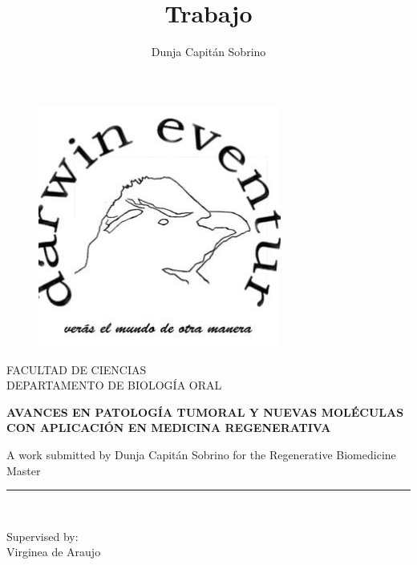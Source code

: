 \documentclass[a4paper,openright,12pt]{report}
\author{Dunja Capitán Sobrino}
\title{Trabajo}
\begin{document}
\begin{titlepage}

\begin{center}
\vspace*{-1in}
\begin{figure}[htb]
\begin{center}
\includegraphics[width=8cm]{./figuras/logo.jpg}
\end{center}
\end{figure}

FACULTAD DE CIENCIAS\\
\vspace*{0.15in}
DEPARTAMENTO DE BIOLOGÍA ORAL \\
\vspace*{0.6in}
\begin{large}
\textbf{AVANCES EN PATOLOGÍA TUMORAL Y NUEVAS
MOLÉCULAS CON APLICACIÓN EN MEDICINA REGENERATIVA} \\
\end{large}
\vspace*{0.2in}
\begin{Large}

\end{Large}
\vspace*{0.3in}
\begin{large}
A work submitted by Dunja Capitán Sobrino for the Regenerative Biomedicine Master \\
\end{large}
\vspace*{0.3in}
\rule{80mm}{0.1mm}\\
\vspace*{0.1in}
\begin{large}
Supervised by: \\
Virginea de Araujo \\
\end{large}
\end{center}

\end{titlepage}
\end{document}
